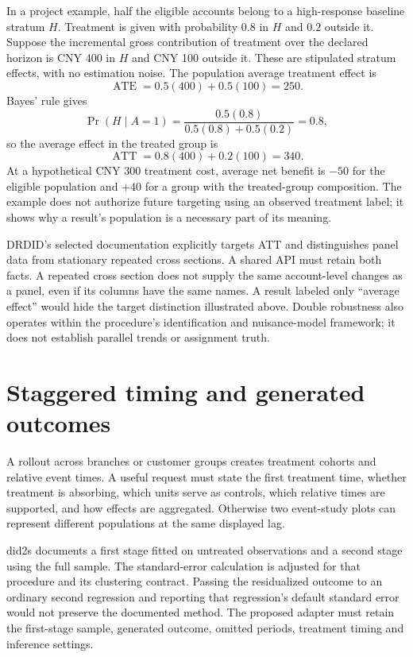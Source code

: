 In a project example, half the eligible accounts belong to a high-response
baseline stratum \(H\). Treatment is given with probability \(0.8\) in \(H\)
and \(0.2\) outside it. Suppose the incremental gross contribution of treatment
over the declared horizon is CNY 400 in \(H\) and CNY 100 outside it. These
are stipulated stratum effects, with no estimation noise. The population
average treatment effect is
\[
 \operatorname{ATE}=0.5(400)+0.5(100)=250.
\]
Bayes' rule gives
\[
 \Pr(H\mid A=1)
 =\frac{0.5(0.8)}{0.5(0.8)+0.5(0.2)}=0.8,
\]
so the average effect in the treated group is
\[
 \operatorname{ATT}=0.8(400)+0.2(100)=340.
\]
At a hypothetical CNY 300 treatment cost, average net benefit is \(-50\)
for the eligible population and \(+40\) for a group with the treated-group
composition. The example does not authorize future targeting using an observed
treatment label; it shows why a result's population is a necessary part of its
meaning.

DRDID's selected documentation explicitly targets ATT and distinguishes panel
data from stationary repeated cross sections. A shared API must retain both
facts. A repeated cross section does not supply the same account-level changes
as a panel, even if its columns have the same names. A result labeled only
``average effect'' would hide the target distinction illustrated above.
Double robustness also operates within the procedure's identification and
nuisance-model framework; it does not establish parallel trends or assignment
truth.\cite{v12_sw_drdid}

\section{Staggered timing and generated outcomes}

A rollout across branches or customer groups creates treatment cohorts and
relative event times. A useful request must state the first treatment time,
whether treatment is absorbing, which units serve as controls, which relative
times are supported, and how effects are aggregated. Otherwise two event-study
plots can represent different populations at the same displayed lag.

did2s documents a first stage fitted on untreated observations and a second
stage using the full sample. The standard-error calculation is adjusted for
that procedure and its clustering contract. Passing the residualized outcome
to an ordinary second regression and reporting that regression's default
standard error would not preserve the documented method. The proposed adapter
must retain the first-stage sample, generated outcome, omitted periods,
treatment timing and inference settings.\cite{v12_sw_did2s}

